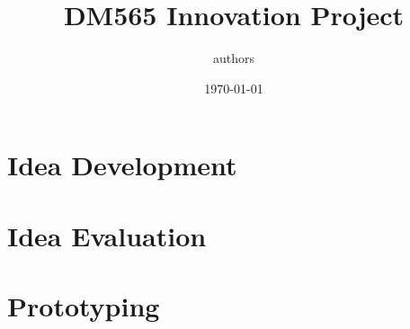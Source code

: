 \documentclass{article}
\title{DM565 Innovation Project}
\author{authors}
\date{\today}
\begin{document}
\maketitle

\newpage

\tableofcontents

\newpage

\section{Idea Development}

\section{Idea Evaluation}

\section{Prototyping}
\end{document}
